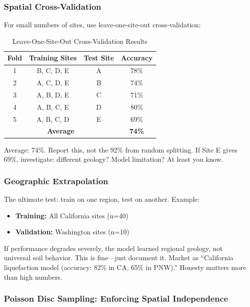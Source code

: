 \documentclass[12pt]{article}
\begin{document}
\subsubsection{Spatial Cross-Validation}

For small numbers of sites, use leave-one-site-out cross-validation:

\begin{table}[h]
	\centering
	\caption{Leave-One-Site-Out Cross-Validation Results}
	\label{tab:loo_cv}
	\begin{tabular}{@{}cccc@{}}
		\toprule
		\textbf{Fold} & \textbf{Training Sites} & \textbf{Test Site} & \textbf{Accuracy} \\
		\midrule
		1 & B, C, D, E & A & 78\% \\
		2 & A, C, D, E & B & 74\% \\
		3 & A, B, D, E & C & 71\% \\
		4 & A, B, C, E & D & 80\% \\
		5 & A, B, C, D & E & 69\% \\
		\midrule
		\multicolumn{3}{c}{\textbf{Average}} & \textbf{74\%} \\
		\bottomrule
	\end{tabular}
\end{table}

Average: 74\%. Report this, not the 92\% from random splitting. If Site E gives 69\%, investigate: different geology? Model limitation? At least you know.

\subsubsection{Geographic Extrapolation}

The ultimate test: train on one region, test on another. Example:

\begin{itemize}
	\item \textbf{Training:} All California sites (n=40)
	\item \textbf{Validation:} Washington sites (n=10)
\end{itemize}

If performance degrades severely, the model learned regional geology, not universal soil behavior. This is fine---just document it. Market as ``California liquefaction model (accuracy: 82\% in CA, 65\% in PNW).'' Honesty matters more than high numbers.

\subsubsection{Poisson Disc Sampling: Enforcing Spatial Independence}
\end{document}

